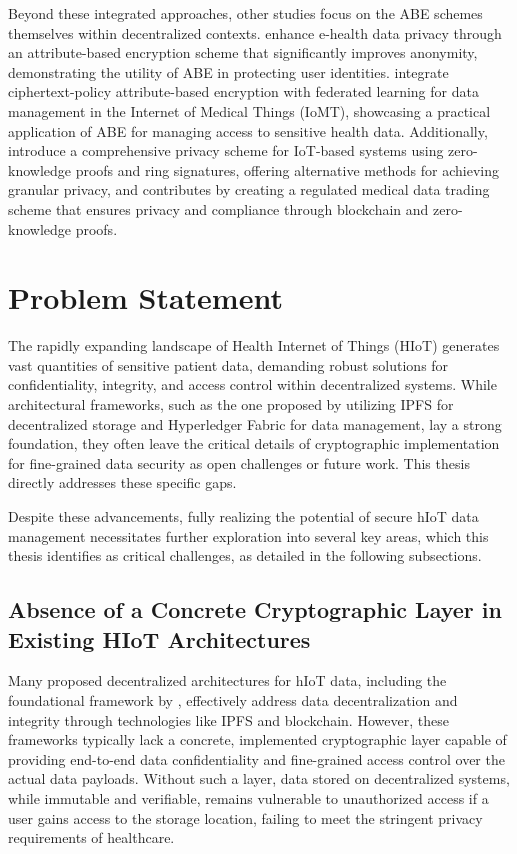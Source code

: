\documentclass[cic,tc,english]{iiufrgs}
\begin{document}
            Beyond these integrated approaches, other studies focus on the ABE schemes themselves within decentralized contexts. \citet{Zala2024} enhance e-health data privacy through an attribute-based encryption scheme that significantly improves anonymity, demonstrating the utility of ABE in protecting user identities. \citet{Bhansali2022} integrate ciphertext-policy attribute-based encryption with federated learning for data management in the Internet of Medical Things (IoMT), showcasing a practical application of ABE for managing access to sensitive health data. Additionally, \citet{Esfahani2024} introduce a comprehensive privacy scheme for IoT-based systems using zero-knowledge proofs and ring signatures, offering alternative methods for achieving granular privacy, and \citet{Li2024} contributes by creating a regulated medical data trading scheme that ensures privacy and compliance through blockchain and zero-knowledge proofs.

    \section{Problem Statement}
        \label{sec:problemstatement}

        The rapidly expanding landscape of Health Internet of Things (HIoT) generates vast quantities of sensitive patient data, demanding robust solutions for confidentiality, integrity, and access control within decentralized systems. While architectural frameworks, such as the one proposed by \citet{laura2023} utilizing IPFS for decentralized storage and Hyperledger Fabric for data management, lay a strong foundation, they often leave the critical details of cryptographic implementation for fine-grained data security as open challenges or future work. This thesis directly addresses these specific gaps.

        Despite these advancements, fully realizing the potential of secure hIoT data management necessitates further exploration into several key areas, which this thesis identifies as critical challenges, as detailed in the following subsections.

        \subsection{Absence of a Concrete Cryptographic Layer in Existing HIoT Architectures}
            Many proposed decentralized architectures for hIoT data, including the foundational framework by \citet{laura2023}, effectively address data decentralization and integrity through technologies like IPFS and blockchain. However, these frameworks typically lack a concrete, implemented cryptographic layer capable of providing end-to-end data confidentiality and fine-grained access control over the actual data payloads. Without such a layer, data stored on decentralized systems, while immutable and verifiable, remains vulnerable to unauthorized access if a user gains access to the storage location, failing to meet the stringent privacy requirements of healthcare.
\end{document}
